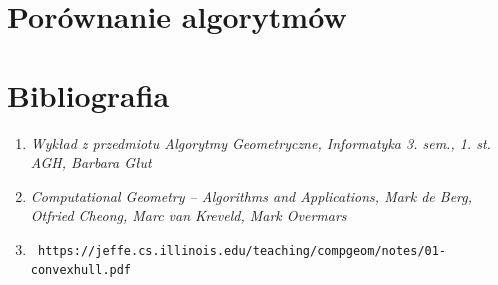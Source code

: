 \documentclass[11pt]{article}
\theoremstyle{remark} \newtheorem{definition}{def.}
\theoremstyle{definition} \newtheorem{twierdzenie}{tw.}
\begin{document}
\section{Porównanie algorytmów}



\section{Bibliografia}

\begin{enumerate}
    \item   \emph{Wykład z przedmiotu Algorytmy Geometryczne, Informatyka 3. sem., 1. st. AGH, Barbara Głut}
    \item   \emph{Computational Geometry -- Algorithms and Applications, Mark de Berg, Otfried Cheong, Marc van Kreveld, Mark Overmars} 
    \item   \begin{verbatim} https://jeffe.cs.illinois.edu/teaching/compgeom/notes/01-convexhull.pdf \end{verbatim}
\end{enumerate}


\end{document}
